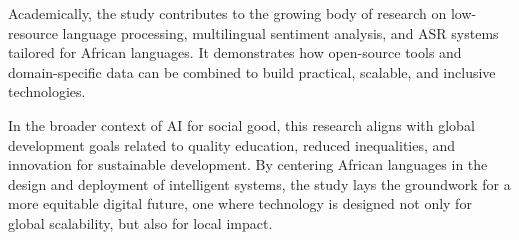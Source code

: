 \noindent Academically, the study contributes to the growing body of research on low-resource language processing, multilingual sentiment analysis, and ASR systems tailored for African languages. It demonstrates how open-source tools and domain-specific data can be combined to build practical, scalable, and inclusive technologies.

\noindent In the broader context of AI for social good, this research aligns with global development goals related to quality education, reduced inequalities, and innovation for sustainable development. By centering African languages in the design and deployment of intelligent systems, the study lays the groundwork for a more equitable digital future, one where technology is designed not only for global scalability, but also for local impact.


